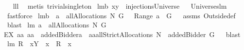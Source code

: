 \begin{isabellebody}
\isadelimproof
\ %
\endisadelimproof
%
\isatagproof
{}\isamarkupfalse%
\ lll{}{}\ \isamarkupfalse%
\ {\isacharparenleft}metis\ trivial{\isacharunderscore}singleton{\isacharparenright}%
\endisatagproof
{\isafoldproof}%
%
\isadelimproof
%
\endisadelimproof
\isanewline
{}\isamarkupfalse%
\ lm{}{}b{\isacharcolon}\ {\isachardoublequoteopen}{\isacharbraceleft}x{\isacharbraceright}{\isasymtimes}{\isacharbraceleft}y{\isacharbraceright}\ {\isasymin}\ injectionsUniverse{\isachardoublequoteclose}%
\isadelimproof
\ %
\endisadelimproof
%
\isatagproof
{}\isamarkupfalse%
\ Universes{\isachardot}lm{}{}\ \isamarkupfalse%
\ fastforce%
\endisatagproof
{\isafoldproof}%
%
\isadelimproof
%
\endisadelimproof
\isanewline
{}\isamarkupfalse%
\ lm{}{}b{\isacharcolon}\ \ {\isachardoublequoteopen}a\ {\isasymin}\ allAllocations{\isacharprime}{\isacharprime}{\isacharprime}\ N\ G{\isachardoublequoteclose}\ \ {\isachardoublequoteopen}{\isasymUnion}\ Range\ a\ {\isasymsubseteq}\ G{\isachardoublequoteclose}%
\isadelimproof
\ %
\endisadelimproof
%
\isatagproof
{}\isamarkupfalse%
\ assms\ Outside{\isacharunderscore}def\ \isamarkupfalse%
\ blast%
\endisatagproof
{\isafoldproof}%
%
\isadelimproof
%
\endisadelimproof
\isanewline
{}\isamarkupfalse%
\ lm{}{}{\isacharcolon}\ {\isachardoublequoteopen}a\ {\isasymin}\ allAllocations{\isacharprime}{\isacharprime}{\isacharprime}\ N\ G\ {\isacharequal}\ \isanewline
{\isacharparenleft}EX\ aa{\isachardot}\ aa\ {\isacharminus}{\isacharminus}\ {\isacharparenleft}addedBidder{\isacharprime}{\isacharparenright}{\isacharequal}a\ {\isacharampersand}\ aa{\isasymin}allStrictAllocations{\isacharprime}{\isacharprime}{\isacharprime}\ {\isacharparenleft}N\ {\isasymunion}\ {\isacharbraceleft}addedBidder{\isacharprime}{\isacharbraceright}{\isacharparenright}\ G{\isacharparenright}{\isachardoublequoteclose}%
\isadelimproof
\ %
\endisadelimproof
%
\isatagproof
{}\isamarkupfalse%
\ blast%
\endisatagproof
{\isafoldproof}%
%
\isadelimproof
%
\endisadelimproof
\isanewline
\isanewline
{}\isamarkupfalse%
\ lm{}{}{\isacharcolon}\ {\isachardoublequoteopen}{\isacharparenleft}R\ {\isacharplus}{\isacharasterisk}\ {\isacharparenleft}{\isacharbraceleft}x{\isacharbraceright}{\isasymtimes}Y{\isacharparenright}{\isacharparenright}\ {\isacharminus}{\isacharminus}\ x\ {\isacharequal}\ R\ {\isacharminus}{\isacharminus}\ x{\isachardoublequoteclose}%

\end{isabellebody}
